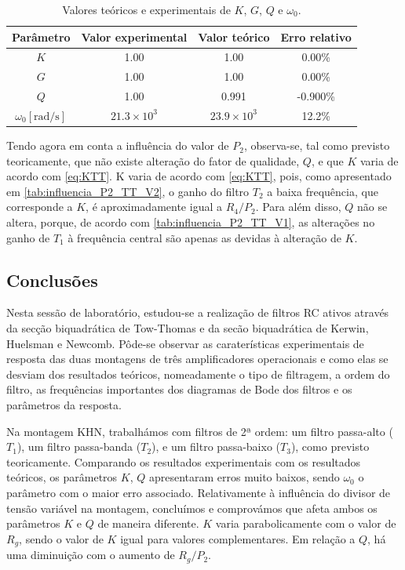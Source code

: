 \begin{table}[h!]
    \centering
    \caption{Valores teóricos e experimentais de $K$, $G$, $Q$ e $\omega_0$.}
    \label{tab:valores_teoricos_experimentais_TT}
    \begin{tabular}{cccc}
    \hline
    Parâmetro & Valor experimental & Valor teórico & Erro relativo \\
    \hline  
    $K$ & 1.00  & 1.00  & 0.00\% \\
    $G$ & 1.00  & 1.00  & 0.00\% \\
    $Q$ & 1.00  & 0.991  & -0.900\% \\
    $\omega_0 [\si{\radian\per\second}]$ & $21.3 \times 10^3$ & $23.9 \times 10^3$ & 12.2\% \\
    \hline
    \end{tabular}
\end{table}

Tendo agora em conta a influência do valor de $P_2$, observa-se, tal como previsto teoricamente, que não existe alteração do fator de qualidade, $Q$, e que $K$ varia de acordo com \eqref{eq:KTT}. K varia de acordo com \eqref{eq:KTT}, pois, como apresentado em \ref{tab:influencia_P2_TT_V2}, o ganho do filtro $T_2$ a baixa frequência, que corresponde a $K$, é aproximadamente igual a $R_4/P_2$. Para além disso, $Q$ não se altera, porque, de acordo com \ref{tab:influencia_P2_TT_V1}, as alterações no ganho de $T_1$ à frequência central são apenas as devidas à alteração de $K$.

\subsection{Conclusões}

Nesta sessão de laboratório, estudou-se a realização de filtros RC ativos através da secção biquadrática de Tow-Thomas e da secão biquadrática de Kerwin, Huelsman e Newcomb. Pôde-se observar as caraterísticas experimentais de resposta das duas montagens de três amplificadores operacionais e como elas se desviam dos resultados teóricos, nomeadamente o tipo de filtragem, a ordem do filtro, as frequências importantes dos diagramas de Bode dos filtros e os parâmetros da resposta.

Na montagem KHN, trabalhámos com filtros de 2ª ordem: um filtro passa-alto ($T_1$), um filtro passa-banda ($T_2$), e um filtro passa-baixo ($T_3$), como previsto teoricamente. Comparando os resultados experimentais com os resultados teóricos, os parâmetros $K$, $Q$ apresentaram erros muito baixos, sendo $\omega_0$ o parâmetro com o maior erro associado. Relativamente à influência do divisor de tensão variável na montagem, concluímos e comprovámos que afeta ambos os parâmetros $K$ e $Q$ de maneira diferente. $K$ varia parabolicamente com o valor de $R_g$, sendo o valor de $K$ igual para valores complementares. Em relação a $Q$, há uma diminuição com o aumento de ${R_g}/{P_2}$.

